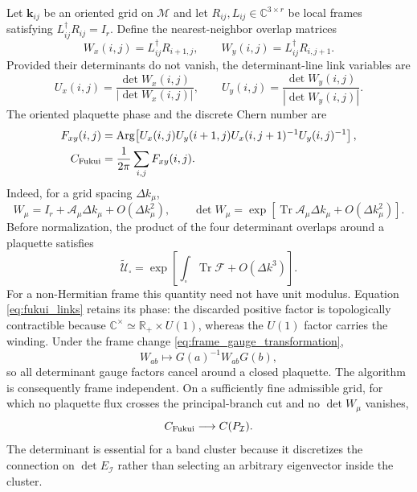\documentclass[11pt]{article}
\numberwithin{equation}{section}
\begin{document}
Let $\mathbf k_{ij}$ be an oriented grid on $\mathcal M$ and let
$R_{ij},L_{ij}\in\mathbb C^{3\times r}$ be local frames satisfying
$L_{ij}^\dagger R_{ij}=I_r$. Define the nearest-neighbor overlap matrices
\begin{equation}
  W_x(i,j)=L_{ij}^\dagger R_{i+1,j},
  \qquad
  W_y(i,j)=L_{ij}^\dagger R_{i,j+1}.
  \label{eq:fukui_overlap}
\end{equation}
Provided their determinants do not vanish, the determinant-line link
variables are
\begin{equation}
  U_x(i,j)=\frac{\det W_x(i,j)}{|\det W_x(i,j)|},
  \qquad
  U_y(i,j)=\frac{\det W_y(i,j)}{|\det W_y(i,j)|}.
  \label{eq:fukui_links}
\end{equation}
The oriented plaquette phase and the discrete Chern number are
\begin{align}
  F_{xy}(i,j)&=\operatorname{Arg}\!\left[
  U_x(i,j)U_y(i+1,j)
  U_x(i,j+1)^{-1}U_y(i,j)^{-1}
  \right],\\
  C_{\rm Fukui}&=\frac{1}{2\pi}\sum_{i,j}F_{xy}(i,j).
  \label{eq:fukui_chern}
\end{align}
Indeed, for a grid spacing $\Delta k_\mu$,
\begin{equation}
  W_\mu=I_r+\mathcal A_\mu\Delta k_\mu+O(\Delta k_\mu^2),
  \qquad
  \det W_\mu=
  \exp\!\left[
  \operatorname{Tr}\mathcal A_\mu\Delta k_\mu+O(\Delta k_\mu^2)
  \right].
  \label{eq:fukui_continuum_limit}
\end{equation}
Before normalization, the product of the four determinant overlaps around
a plaquette satisfies
\begin{equation}
  \widetilde{\mathcal U}_{\square}
  =\exp\!\left[
  \int_{\square}\operatorname{Tr}\mathcal F+O(\Delta k^3)
  \right].
  \label{eq:fukui_plaquette_limit}
\end{equation}
For a non-Hermitian frame this quantity need not have unit modulus.
Equation \eqref{eq:fukui_links} retains its phase: the discarded positive
factor is topologically contractible because
$\mathbb C^\times\simeq\mathbb R_+\times U(1)$, whereas the $U(1)$ factor
carries the winding. Under the frame change
\eqref{eq:frame_gauge_transformation},
\begin{equation}
  W_{ab}\mapsto G(a)^{-1}W_{ab}G(b),
\end{equation}
so all determinant gauge factors cancel around a closed plaquette. The
algorithm is consequently frame independent. On a sufficiently fine
admissible grid, for which no plaquette flux crosses the principal-branch
cut and no $\det W_\mu$ vanishes,
\begin{equation}
  C_{\rm Fukui}\longrightarrow C(P_{\mathcal I}).
\end{equation}
The determinant is essential for a band cluster because it discretizes
the connection on $\det E_{\mathcal I}$ rather than selecting an arbitrary
eigenvector inside the cluster.
\end{document}
